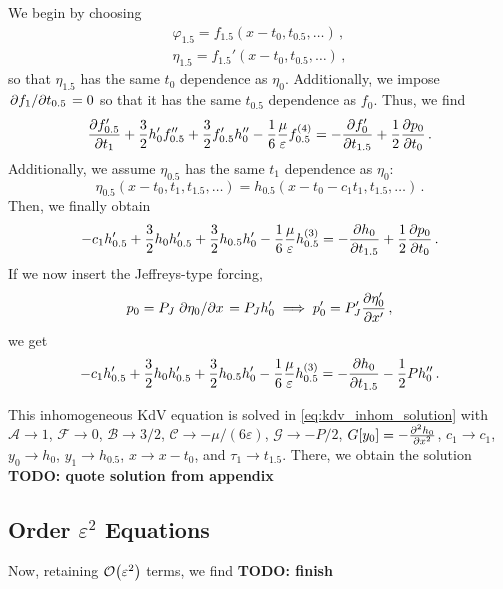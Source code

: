 \documentclass{jfm}
\let\Oldsubsection\subsection
\renewcommand{\subsection}{\FloatBarrier\Oldsubsection}
\renewcommand*{\epsilon}{\varepsilon}
\begin{document}
We begin by choosing
\begin{align}
  \varphi_{1.5} = f_{1.5}(x-t_0,t_{0.5},\ldots) \,, \\
  \eta_{1.5} = f_{1.5}'(x-t_0,t_{0.5},\ldots) \,,
\end{align}
so that $\eta_{1.5}$ has the same $t_0$ dependence as $\eta_0$.
Additionally, we impose $\pdv*{f_1}{t_{0.5}} = 0$ so that it has the
same $t_{0.5}$ dependence as $f_0$.
Thus, we find
\begin{equation}
  \pdv{f_{0.5}'}{t_1}
    + \frac{3}{2} h_0' f_{0.5}''
    + \frac{3}{2} f_{0.5}' h_0''
    - \frac{1}{6} \frac{\mu}{\epsilon} f_{0.5}^{(4)}
  =
  - \pdv{f_0'}{t_{1.5}}
    + \frac{1}{2} \pdv{p_0}{t_0}
    \,.
\end{equation}
Additionally, we assume $\eta_{0.5}$ has the same $t_1$ dependence as
$\eta_0$:
\begin{equation}
  \eta_{0.5}(x-t_0,t_1,t_{1.5},\ldots) = h_{0.5}(x - t_0 - c_1 t_1,
    t_{1.5}, \ldots) \,.
\end{equation}
Then, we finally obtain
\begin{equation}
    -c_1 h_{0.5}'
    + \frac{3}{2} h_0 h_{0.5}'
    + \frac{3}{2} h_{0.5} h_0'
    - \frac{1}{6} \frac{\mu}{\epsilon} h_{0.5}^{(3)}
  =
  - \pdv{h_0}{t_{1.5}}
    + \frac{1}{2} \pdv{p_0}{t_0}
    \,.
\end{equation}
If we now insert the Jeffreys-type forcing,
\begin{equation}
  p_0 = P_J \pdv*{\eta_0}{x} = P_J h_0' \implies p'_0 = P'_J
  \pdv{\eta'_0}{x'} \,,
\end{equation}
we get
\begin{equation}
    -c_1 h_{0.5}'
    + \frac{3}{2} h_0 h_{0.5}'
    + \frac{3}{2} h_{0.5} h_0'
    - \frac{1}{6} \frac{\mu}{\epsilon} h_{0.5}^{(3)}
  =
  - \pdv{h_0}{t_{1.5}} - \frac{1}{2} P h_0'' \,.
\end{equation}

This inhomogeneous KdV equation is solved in
\cref{eq:kdv_inhom_solution} with $\mathcal{A} \to 1$, $\mathcal{F} \to
0$, $\mathcal{B} \to 3/2$, $\mathcal{C} \to -\mu/(6 \epsilon)$,
$\mathcal{G} \to -P/2$, $G[y_0] = -
\pdv[2]{h_0}{x}$, $c_1 \to c_1$, $y_0 \to h_0$, $y_1 \to h_{0.5}$, $x
\to x-t_0$, and $\tau_1 \to t_{1.5}$.
There, we obtain the solution
\textbf{TODO: quote solution from appendix}

\subsection{Order \texorpdfstring{$\epsilon^{2}$}{2} Equations}
Now, retaining $\order{\epsilon^2}$ terms, we find
\textbf{TODO: finish}
\end{document}
